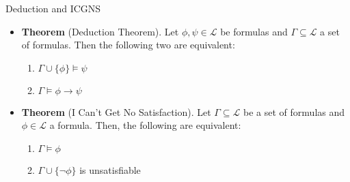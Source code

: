\begin{frame}{Deduction and ICGNS}

	\begin{itemize}%
	\itemsep=16pt
	
		\item \textbf{Theorem} (Deduction Theorem). Let $\phi,\psi\in\mathcal{L}$ be formulas and $\Gamma\subseteq\mathcal{L}$ a set of formulas. Then the following two are equivalent:
			\begin{enumerate}[1.]
			
				\item $\Gamma\cup\{\phi\}\vDash\psi$
				
				\item $\Gamma\vDash \phi\to\psi$
			
			\end{enumerate}


		\item \textbf{Theorem} (I Can't Get No Satisfaction).
			Let $\Gamma\subseteq\mathcal{L}$ be a set of formulas and $\phi\in\mathcal{L}$ a formula. Then, the following are equivalent:
			\begin{enumerate}[1.]
			
				\item $\Gamma\vDash\phi$
				
				\item $\Gamma\cup\{\neg\phi\}$ is unsatisfiable
			
			\end{enumerate}

	
	\end{itemize}

\end{frame}

